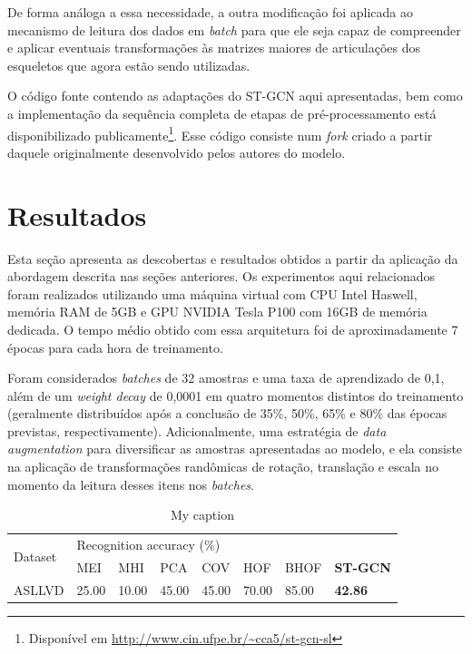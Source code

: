 De forma análoga a essa necessidade, a outra modificação foi aplicada ao mecanismo de leitura dos dados em \textit{batch} para que ele seja capaz de compreender e aplicar eventuais transformações às matrizes maiores de articulações dos esqueletos que agora estão sendo utilizadas. 

O código fonte contendo as adaptações do ST-GCN aqui apresentadas, bem como a implementação da sequência completa de etapas de pré-processamento está disponibilizado publicamente\footnote{
    Disponível em \url{http://www.cin.ufpe.br/~cca5/st-gcn-sl}
}. Esse código consiste num \textit{fork} criado a partir daquele originalmente desenvolvido pelos autores do modelo.


\section{Resultados} %
\label{sec:resultados}

Esta seção apresenta as descobertas e resultados obtidos a partir da aplicação da abordagem descrita nas seções anteriores. Os experimentos aqui relacionados foram realizados utilizando uma máquina virtual com CPU Intel Haswell, memória RAM de 5GB e GPU NVIDIA Tesla P100 com 16GB de memória dedicada. O tempo médio obtido com essa arquitetura foi de aproximadamente 7 épocas para cada hora de treinamento.

Foram considerados \textit{batches} de 32 amostras e uma taxa de aprendizado de 0,1, além de um \textit{weight decay} de 0,0001 em quatro momentos distintos do treinamento (geralmente distribuídos após a conclusão de 35\%, 50\%, 65\% e 80\% das épocas previstas, respectivamente). 
Adicionalmente, uma estratégia de \textit{data augmentation} para diversificar as amostras apresentadas ao modelo, e ela consiste na aplicação de transformações randômicas de rotação, translação e escala no momento da leitura desses itens nos \textit{batches}.


\begin{table}[ht]
\centering
\caption{My caption}
\label{my-label}
\begin{tabular}{@{}llllllll@{}}
\toprule
\multirow{2}{*}{Dataset} & \multicolumn{6}{l}{Recognition accuracy (\%)}                                                                \\ \cmidrule(l){2-8} 
            & MEI   & MHI   & PCA   & COV   & HOF   & BHOF   & \textbf{ST-GCN}  \\ \midrule
    ASLLVD  & 25.00 & 10.00 & 45.00 & 45.00 & 70.00 & 85.00  & \textbf{42.86} \\ \bottomrule
\end{tabular}
\end{table}



